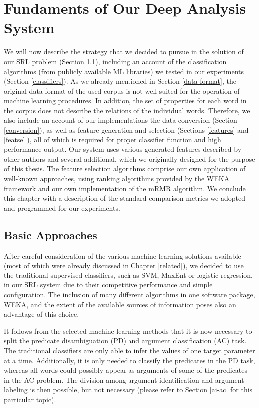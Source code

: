 \documentclass[12pt,notitlepage]{report}
\begin{document}
%
%
\chapter{Fundaments of Our Deep Analysis System}\label{ml-semantic}
%
%

We will now describe the strategy that we decided to pursue in the solution of our SRL problem (Section \ref{approach}), including an account of the classification algorithms (from publicly available ML libraries) we tested in our experiments (Section \ref{classifiers}). As we already mentioned in Section \ref{data-format}, the original data format of the used corpus is not well-suited for the operation of machine learning procedures. In addition, the set of properties for each word in the corpus does not describe the relations of the individual words. Therefore, we also include an account of our implementations the data conversion (Section \ref{conversion}), as well as feature generation and selection (Sections \ref{features} and \ref{featsel}), all of which is required for proper classifier function and high performance output. Our system uses various generated features described by other authors and several additional, which we originally designed for the purpose of this thesis. The feature selection algorithms comprise our own application of well-known approaches, using ranking algorithms provided by the WEKA framework and our own implementation of the mRMR algorithm. We conclude this chapter with a description of the standard comparison metrics we adopted and programmed for our experiments.

\section{Basic Approaches}\label{approach}

After careful consideration of the various machine learning solutions available (most of which were already discussed in Chapter \ref{related}), we decided to use the traditional supervised classifiers, such as SVM, MaxEnt or logistic regression, in our SRL system due to their competitive performance and simple configuration. The inclusion of many different algorithms in one software package, WEKA, and the extent of the available sources of information poses also an advantage of this choice.

It follows from the selected machine learning methods that it is now necessary to split the predicate disambiguation (PD) and argument classification (AC) task. The traditional classifiers are only able to infer the values of one target parameter at a time. Additionally, it is only needed to classify the predicates in the PD task, whereas all words could possibly appear as arguments of some of the predicates in the AC problem. The division among argument identification and argument labeling is then possible, but not necessary (please refer to Section \ref{ai-ac} for this particular topic). 
\end{document}

